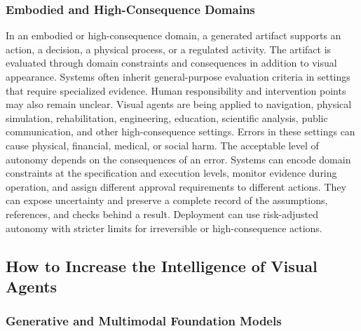 \subsubsection{Embodied and High-Consequence Domains}

In an embodied or high-consequence domain, a generated artifact supports an action, a decision, a physical process, or a regulated activity. The artifact is evaluated through domain constraints and consequences in addition to visual appearance. Systems often inherit general-purpose evaluation criteria in settings that require specialized evidence. Human responsibility and intervention points may also remain unclear. Visual agents are being applied to navigation, physical simulation, rehabilitation, engineering, education, scientific analysis, public communication, and other high-consequence settings. Errors in these settings can cause physical, financial, medical, or social harm. The acceptable level of autonomy depends on the consequences of an error. Systems can encode domain constraints at the specification and execution levels, monitor evidence during operation, and assign different approval requirements to different actions. They can expose uncertainty and preserve a complete record of the assumptions, references, and checks behind a result. Deployment can use risk-adjusted autonomy with stricter limits for irreversible or high-consequence actions.


\subsection{How to Increase the Intelligence of Visual Agents}

\subsubsection{Generative and Multimodal Foundation Models}

